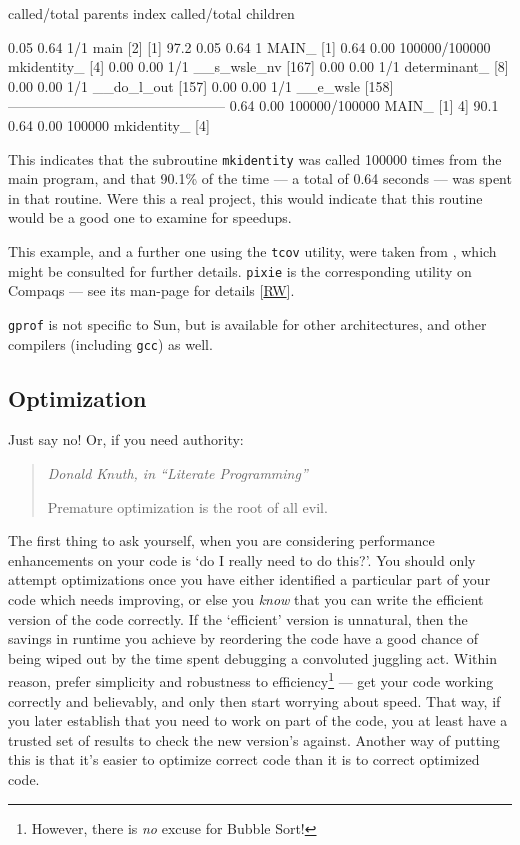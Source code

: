 \documentclass[11pt,oneside,chapters]{starlink}
\begin{document}
\begin{terminalv}
called/total       parents
index  %
called/total       children

0.05        0.64       1/1           main [2]
[1]     97.2    0.05        0.64       1         MAIN_ [1]
0.64        0.00  100000/100000      mkidentity_ [4]
0.00        0.00       1/1           __s_wsle_nv [167]
0.00        0.00       1/1           determinant_ [8]
0.00        0.00       1/1           __do_l_out [157]
0.00        0.00       1/1           __e_wsle [158]
 -----------------------------------------------
0.64        0.00  100000/100000      MAIN_ [1]
4]     90.1    0.64        0.00  100000         mkidentity_ [4]
\end{terminalv}

This indicates that the subroutine \texttt{mkidentity}
was called 100000 times from the main program, and that
90.1\% of the time --- a total of 0.64 seconds --- was spent
in that routine.  Were this a real project, this would
indicate that this routine would be a good one to examine
for speedups.

This example, and a further one using the
\texttt{tcov} utility, were taken from
\citet{sunf77}, which might be consulted for
further details.  \texttt{pixie} is the corresponding
utility on Compaqs --- see its man-page for details
[\hyperlink{ta:rw}{RW}].

\texttt{gprof} is not specific to Sun, but is
available for other architectures, and other compilers
(including \texttt{gcc}) as well.


\subsection{Optimization}
\label{s:optim}

Just say no!  Or, if you need authority:

\begin{quotation}
\emph{Donald Knuth, in ``Literate Programming''}

Premature optimization is the root of all evil.
\end{quotation}

The first thing to ask yourself, when you are considering
performance enhancements on your code is `do I really need
to do this?'.  You should only attempt optimizations once
you have either identified a particular part of your code
which needs improving, or else you \emph{know} that you
can write the efficient version of the code correctly.  If
the `efficient' version is unnatural, then the savings in
runtime you achieve by reordering the code have a good
chance of being wiped out by the time spent debugging a
convoluted juggling act.  Within reason, prefer simplicity
and robustness to efficiency\footnote{However, there is
\emph{no} excuse for Bubble Sort!} --- get
your code working correctly and believably, and only then
start worrying about speed.  That way, if you later
establish that you need to work on part of the code, you
at least have a trusted set of results to check the new
version's against.  Another way of putting this is that
it's easier to optimize correct code than it is to correct
optimized code.
\end{document}
